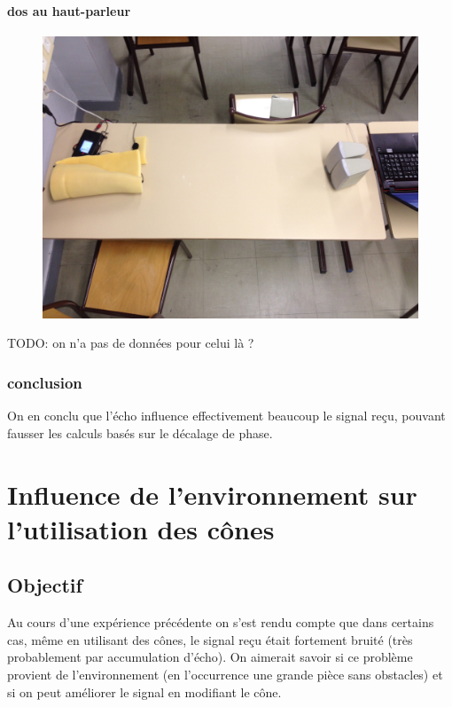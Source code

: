 \subsubsection{dos au haut-parleur}

\begin{figure}[H]
\includegraphics[width=\textwidth]{../tests/test_du_protocole/IMG_0924.jpg} 
\end{figure}

TODO: on n'a pas de données pour celui là ?

\subsection{conclusion}
On en conclu que l'écho influence effectivement beaucoup le signal reçu, pouvant fausser les calculs basés sur le décalage de phase.


\chapter{Influence de l'environnement sur l'utilisation des cônes}
\section{Objectif}
Au cours d'une expérience précédente on s'est rendu compte que dans certains cas, même en utilisant des cônes, le signal reçu était fortement bruité (très probablement par accumulation d'écho). On aimerait savoir si ce problème provient de l'environnement (en l'occurrence une grande pièce sans obstacles) et si on peut améliorer le signal en modifiant le cône.

